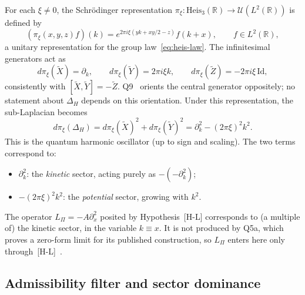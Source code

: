 \documentclass[11pt,a4paper]{article}
\theoremstyle{definition}
\theoremstyle{remark}
\newcommand{\HeisR}{\mathrm{Heis}_3(\mathbb{R})}
\newcommand{\DeltaH}{\Delta_H}
\newcommand{\LPi}{L_\Pi}
\begin{document}
    For each $\xi \neq 0$, the Schr\"{o}dinger representation
    $\pi_\xi : \HeisR \to \mathcal{U}(L^2(\mathbb{R}))$ is defined by
    \begin{equation}
      (\pi_\xi(x,y,z) f)(k) = e^{2\pi i \xi (yk + xy/2 - z)} f(k + x), \qquad f \in L^2(\mathbb{R}),
      \label{eq:schrodinger}
    \end{equation}
    a unitary representation for the group law~\eqref{eq:heis-law}.
    The infinitesimal generators act as
    \begin{equation}
      d\pi_\xi(\tilde X) = \partial_k, \qquad
      d\pi_\xi(\tilde Y) = 2\pi i \xi k, \qquad
      d\pi_\xi(\tilde Z) = -2\pi i \xi \, \mathrm{Id},
      \label{eq:generators-rep}
    \end{equation}
    consistently with $[\tilde X, \tilde Y] = -\tilde Z$.
    Q9~\cite{Beau2026q9} orients the central generator oppositely; no statement about $\DeltaH$ depends on this
    orientation.
    Under this representation, the sub-Laplacian becomes
    \begin{equation}
      d\pi_\xi(\DeltaH) = d\pi_\xi(\tilde X)^2 + d\pi_\xi(\tilde Y)^2
      = \partial_k^2 - (2\pi\xi)^2 k^2.
      \label{eq:harmonic-osc}
    \end{equation}
    This is the quantum harmonic oscillator (up to sign and scaling).
    The two terms correspond to:
    \begin{itemize}
      \item $\partial_k^2$: the \emph{kinetic} sector, acting purely as $-(-\partial_k^2)$;
      \item $-(2\pi\xi)^2 k^2$: the \emph{potential} sector, growing with $k^2$.
    \end{itemize}
    The operator $\LPi = -A\partial_x^2$ posited by Hypothesis~[H-L] corresponds to (a multiple of)
    the kinetic sector, in the variable $k \equiv x$.
    It is not produced by Q5a, which proves a zero-form limit for its published construction, so $\LPi$
    enters here only through~[H-L]~\cite{Beau2026q5a}.

  \subsection{Admissibility filter and sector dominance}
\end{document}
